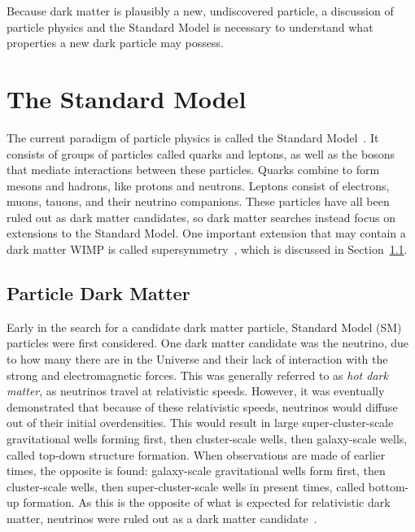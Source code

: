Because dark matter is plausibly a new, undiscovered particle, a discussion of particle physics and the Standard Model is necessary to understand what properties a new dark particle may possess.

\section{The Standard Model}

The current paradigm of particle physics is called the Standard Model~\cite{standardmodel}.
It consists of groups of particles called quarks and leptons, as well as the bosons that mediate interactions between these particles.
Quarks combine to form mesons and hadrons, like protons and neutrons.
Leptons consist of electrons, muons, tauons, and their neutrino companions.
These particles have all been ruled out as dark matter candidates, so dark matter searches instead focus on extensions to the Standard Model.
One important extension that may contain a dark matter WIMP is called supersymmetry~\cite{Jungman:1995df}, which is discussed in Section~\ref{sec_particledm}.

\subsection{Particle Dark Matter}\label{sec_particledm}

Early in the search for a candidate dark matter particle, Standard Model (SM) particles were first considered.
One dark matter candidate was the neutrino, due to how many there are in the Universe and their lack of interaction with the strong and electromagnetic forces.
This was generally referred to as \textit{hot dark matter}, as neutrinos travel at relativistic speeds.
However, it was eventually demonstrated that because of these relativistic speeds, neutrinos would diffuse out of their initial overdensities.
This would result in large super-cluster-scale gravitational wells forming first, then cluster-scale wells, then galaxy-scale wells, called top-down structure formation.
When observations are made of earlier times, the opposite is found: galaxy-scale gravitational wells form first, then cluster-scale wells, then super-cluster-scale wells in present times, called bottom-up formation.
As this is the opposite of what is expected for relativistic dark matter, neutrinos were ruled out as a dark matter candidate~\cite{neutrinoHeirarchical}.

